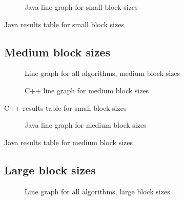 \begin{figure}
    \centering
    \label{fig:java:line:small}
    \caption{Java line graph for small block sizes}
    
\end{figure}
\begin{table}
    \centering
    \label{tab:java:small}
    \caption{Java results table for small block sizes}
    \resizebox{\columnwidth}{!}{
        
    }
\end{table}

\subsection{Medium block sizes}
\begin{figure}
    \centering
    \caption{Line graph for all algorithms, medium block sizes}
    \label{fig:all:line:medium}
    
\end{figure}

\begin{figure}
    \centering
    \label{fig:cpp:line:medium}
    \caption{C++ line graph for medium block sizes}
    
\end{figure}
\begin{table}
    \centering
    \label{tab:cpp:medium}
    \caption{C++ results table for small block sizes}
    \resizebox{\columnwidth}{!}{
        
    }
\end{table}


\begin{figure}
    \centering
    \label{fig:java:line:medium}
    \caption{Java line graph for medium block sizes}
    
\end{figure}
\begin{table}
    \centering
    \label{tab:java:medium}
    \caption{Java results table for medium block sizes}
    
\end{table}

\subsection{Large block sizes}

\begin{figure}
    \centering
    \caption{Line graph for all algorithms, large block sizes}
    \label{fig:all:line:large}
    
\end{figure}

